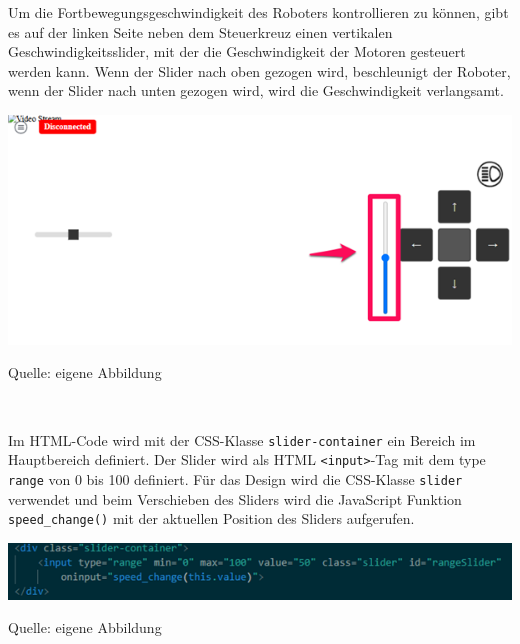 \documentclass[ngerman,12pt,a4paper]{article}
\begin{document}
	Um die Fortbewegungsgeschwindigkeit des Roboters kontrollieren zu können, gibt es auf der linken Seite neben dem Steuerkreuz einen vertikalen Geschwindigkeitsslider, mit der die Geschwindigkeit der Motoren gesteuert werden kann. Wenn der Slider nach oben gezogen wird, beschleunigt der Roboter, wenn der Slider nach unten gezogen wird, wird die Geschwindigkeit verlangsamt. \\[0.5cm]
	\begin{center}
		\begin{minipage}[t]{1\textwidth}
			\includegraphics[scale=0.9]{Pictures/speed-web}
			\label{fig:speed-web}
			\vspace{-10pt}
			\begin{center}
				\par\small Quelle: eigene Abbildung 
			\end{center}
		\end{minipage} \\[0.75cm]
	\end{center}
	Im HTML-Code wird mit der CSS-Klasse \texttt{slider-container} ein Bereich im Hauptbereich definiert. Der Slider wird als HTML \texttt{<input>}-Tag mit dem type \texttt{range} von 0 bis 100 definiert. Für das Design wird die CSS-Klasse \texttt{slider} verwendet und beim Verschieben des Sliders wird die JavaScript Funktion \texttt{speed\_change()} mit der aktuellen Position des Sliders aufgerufen. \\
	\begin{center}
		\begin{minipage}[t]{1\textwidth}
			\includegraphics[scale=0.9]{Pictures/speed-html}
			\label{fig:speed-html}
			\vspace{-10pt}
			\begin{center}
				\par\small Quelle: eigene Abbildung 
			\end{center}
		\end{minipage} \\[0.75cm]
	\end{center}
\end{document}
